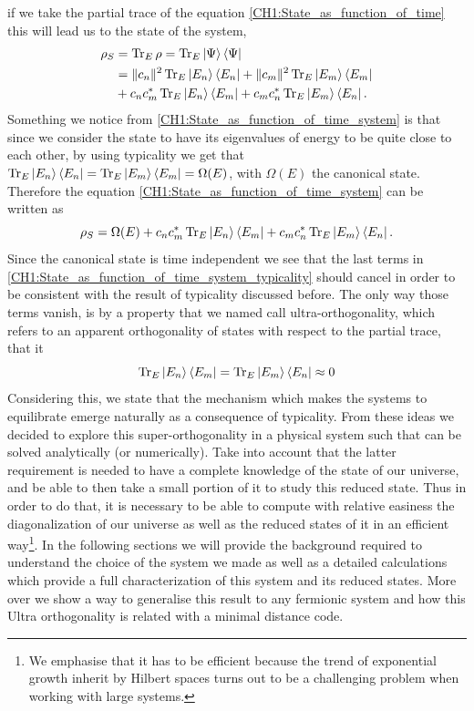 if we take the partial trace of the equation \eqref{CH1:State_as_function_of_time} this will lead us to the state of the system,
\begin{equation}
\begin{aligned}
\rho_S &= \operatorname{Tr}_E \rho = \operatorname{Tr}_E  \mathinner{|{\Psi}\rangle}\mathinner{\langle{\Psi}|}\\
&= \|c_n\|^2\operatorname{Tr}_E  \mathinner{|{E_n}\rangle}\mathinner{\langle{E_n}|} +  \|c_m\|^2 \operatorname{Tr}_E \mathinner{|{E_m}\rangle}\mathinner{\langle{E_m}|} \\
& + c_n c^{*}_m  \operatorname{Tr}_E \mathinner{|{E_n}\rangle}\mathinner{\langle{E_m}|} + c_m c^{*}_n \operatorname{Tr}_E \mathinner{|{E_m}\rangle}\mathinner{\langle{E_n}|}.
\end{aligned}
\label{CH1:State_as_function_of_time_system}
\end{equation}
Something we notice from \eqref{CH1:State_as_function_of_time_system} is that since we consider the state to have its eigenvalues of energy to be quite close to each other, by using typicality we get that $\operatorname{Tr}_E \mathinner{|{E_n}\rangle}\mathinner{\langle{E_n}|} =\operatorname{Tr}_E \mathinner{|{E_m}\rangle}\mathinner{\langle{E_m}|} = \Omega(E)$, with $\Omega(E)$ the canonical state. Therefore the equation \eqref{CH1:State_as_function_of_time_system} can be written as
\begin{equation}
\rho_S= \Omega(E) + c_n c^{*}_m  \operatorname{Tr}_E \mathinner{|{E_n}\rangle}\mathinner{\langle{E_m}|} + c_m c^{*}_n \operatorname{Tr}_E \mathinner{|{E_m}\rangle}\mathinner{\langle{E_n}|}.
\label{CH1:State_as_function_of_time_system_typicality}
\end{equation}
Since the canonical state is time independent we see that the last terms in  \eqref{CH1:State_as_function_of_time_system_typicality} should cancel in order to be consistent with the result of typicality discussed before. The only way those terms vanish, is by a property that we named call ultra-orthogonality, which refers to an apparent orthogonality of states with respect to the partial trace, that it
\begin{equation}
\operatorname{Tr}_E \mathinner{|{E_n}\rangle}\mathinner{\langle{E_m}|} = \operatorname{Tr}_E \mathinner{|{E_m}\rangle}\mathinner{\langle{E_n}|} \approx 0
\end{equation}
Considering this, we state that the mechanism which makes the systems to equilibrate emerge naturally as a consequence of typicality.
\newline
From these ideas we decided to explore this super-orthogonality in a physical system such that can be solved analytically (or numerically). Take into account that the latter requirement is needed to have a complete knowledge of the state of our universe, and be able to then take a small portion of it to study this reduced state. Thus in order to do that, it is necessary to be able to compute with relative easiness the diagonalization of our universe as well as the reduced states of it in an efficient way\footnote{We emphasise that it has to be efficient because the trend of exponential growth inherit by Hilbert spaces turns out to be a challenging problem when working with large systems.}. In the following sections we will provide the background required to understand the choice of the system we made as well as a detailed calculations which provide a full characterization of this system and its reduced states. More over we show a way to generalise this result to any fermionic system and how this Ultra orthogonality is related with a minimal distance code.